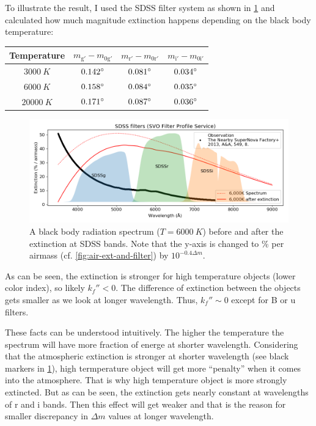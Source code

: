 To illustrate the result, I used the SDSS filter system as shown in \cref{fig:air-ext-bbrad} and calculated how much magnitude extinction happens depending on the black body temperature:

\begin{table}[ht!]
\centering
  \begin{tabular}{c||ccc}
  Temperature  & $ m_\mathrm{g'} - m_\mathrm{0 g'} $ & $ m_\mathrm{r'} - m_\mathrm{0 r'} $ & $ m_\mathrm{i'} - m_\mathrm{0 i'} $ \\
  \hline
  $ \SI{3000}{K} $  & $ \m{0.142} $ & $ \m{0.081} $ & $ \m{0.034} $ \\
  $ \SI{6000}{K} $  & $ \m{0.158} $ & $ \m{0.084} $ & $ \m{0.035} $ \\
  $ \SI{20000}{K} $ & $ \m{0.171} $ & $ \m{0.087} $ & $ \m{0.036} $ \\
  \end{tabular}
\end{table}

\begin{figure}[ht!]
\centering
\includegraphics[width=0.9\linewidth]{figs/air-ext-bbrad}
\caption{A black body radiation spectrum ($ T = \SI{6000}{K} $) before and after the extinction at SDSS bands. Note that the y-axis is changed to \% per airmass (cf. \cref{fig:air-ext-and-filter}) by $ 10^{-0.4 \Delta m} $.}
\label{fig:air-ext-bbrad}
\end{figure}

As can be seen, the extinction is stronger for high temperature objects (lower color index), so likely $ k_f'' < 0 $. The difference of extinction between the objects gets smaller as we look at longer wavelength. Thus, $ k_f'' \sim 0 $ except for B or u filters.

These facts can be understood intuitively. The higher the temperature the spectrum will have more fraction of energe at shorter wavelength. Considering that the atmospheric extinction is stronger at shorter wavelength (see black markers in \cref{fig:air-ext-bbrad}), high termperature object will get more ``penalty'' when it comes into the atmosphere. That is why high temperature object is more strongly extincted. But as can be seen, the extinction gets nearly constant at wavelengths of r and i bands. Then this effect will get weaker and that is the reason for smaller discrepancy in $ \Delta m $ values at longer wavelength.

